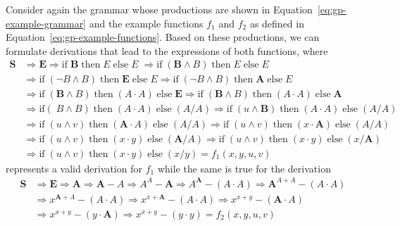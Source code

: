Consider again the grammar whose productions are shown in Equation~\eqref{eq:gp-example-grammar} and the example functions $f_1$ and $f_2$ as defined in Equation~\eqref{eq:gp-example-functions}.
Based on these productions, we can formulate derivations that lead to the expressions of both functions, where
\begin{equation}
	\begin{aligned}
		\bm{S} & \Rightarrow \bm E \Rightarrow \text{if} \; \bm B \; \text{then} \; E \; \text{else} \; E \; \Rightarrow \text{if} \; (\bm B \wedge B) \; \text{then} \; E \; \text{else} \; E \;
		\\ & \Rightarrow \text{if} \; (\neg B \wedge B) \; \text{then} \; \bm E \; \text{else} \; E 
		\Rightarrow \text{if} \; (\neg B \wedge B) \; \text{then} \; \bm A \; \text{else} \; E
		\\ & \Rightarrow \text{if} \; (\bm B \wedge B) \; \text{then} \; (A \cdot A) \; \text{else} \; \bm E  
		 \Rightarrow \text{if} \; (\bm B \wedge B) \; \text{then} \; (A \cdot A) \; \text{else} \; \bm A  
		\\ & \Rightarrow \text{if} (\; B \wedge B) \; \text{then} \; (A \cdot A) \; \text{else} \; (A / A)  
		\Rightarrow \text{if} \; (u \wedge \bm B) \; \text{then} \; (A \cdot A) \; \text{else} \; (A / A)  
		\\ & \Rightarrow \text{if} \; ( u \wedge v) \; \text{then} \; (\bm A \cdot A) \; \text{else} \; (A / A)  
		\Rightarrow \text{if} \; ( u \wedge v) \; \text{then} \; (x \cdot \bm A) \; \text{else} \; (A / A) 
		\\ & \Rightarrow \text{if} \; (u \wedge v) \; \text{then} \; (x \cdot y) \; \text{else} \; (\bm A / A) 
		\Rightarrow \text{if} \; (u \wedge v) \; \text{then} \; (x \cdot y) \; \text{else} \; (x / \bm A) 
		\\ & \Rightarrow \text{if} \; (u \wedge v) \; \text{then} \; (x \cdot y) \; \text{else} \; (x / y) = f_1(x,y,u,v)
	\end{aligned}
\end{equation}
represents a valid derivation for $f_1$ while the same is true for the derivation
\begin{equation}
\begin{aligned}
	\bm{S} & \Rightarrow \bm E \Rightarrow \bm A \Rightarrow \bm A - A \Rightarrow A^A - \bm A \Rightarrow A^{\bm A} - (A \cdot A) \Rightarrow \bm{A}^{A + A} - (A \cdot A) \\  
	& \Rightarrow x^{\bm A + A} - (A \cdot A) \Rightarrow x^{x + \bm A} - (A \cdot A) \Rightarrow x^{x + y} - (\bm A \cdot A) \\ 
	& \Rightarrow x^{x + y} - (y \cdot \bm A) \Rightarrow x^{x + y} - (y \cdot y) = f_2(x,y,u,v)
\end{aligned}
\end{equation}
